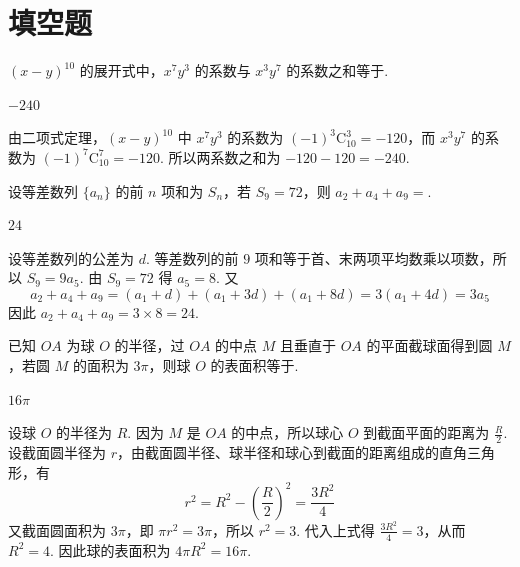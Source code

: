 \section{填空题}

\begin{problem}
\((x - y)^{10}\) 的展开式中，\(x^{7}y^{3}\) 的系数与 \(x^{3}y^{7}\) 的系数之和等于\fillinblank{}.
\end{problem}

\begin{answer}
\(-240\)
\end{answer}

\begin{solution}
由二项式定理，\((x-y)^{10}\) 中 \(x^7y^3\) 的系数为 \((-1)^3\mathrm C_{10}^{3}=-120\)，而 \(x^3y^7\) 的系数为 \((-1)^7\mathrm C_{10}^{7}=-120\). 所以两系数之和为 \(-120-120=-240\).
\end{solution}

\begin{problem}
设等差数列 \(\{a_{n}\}\) 的前 \(n\) 项和为 \(S_{n}\)，若 \(S_{9} = 72\)，则 \(a_{2} + a_{4} + a_{9} = \)\fillinblank{}.
\end{problem}

\begin{answer}
\(24\)
\end{answer}

\begin{solution}
设等差数列的公差为 \(d\). 等差数列的前 \(9\) 项和等于首、末两项平均数乘以项数，所以 \(S_9=9a_5\). 由 \(S_9=72\) 得 \(a_5=8\). 又
\[
a_2+a_4+a_9=(a_1+d)+(a_1+3d)+(a_1+8d)=3(a_1+4d)=3a_5
\]
因此 \(a_2+a_4+a_9=3\times8=24\).
\end{solution}

\begin{problem}
已知 \(OA\) 为球 \(O\) 的半径，过 \(OA\) 的中点 \(M\) 且垂直于 \(OA\) 的平面截球面得到圆 \(M\)，若圆 \(M\) 的面积为 \(3\pi\)，则球 \(O\) 的表面积等于\fillinblank{}.
\end{problem}

\begin{answer}
\(16\pi\)
\end{answer}

\begin{solution}
设球 \(O\) 的半径为 \(R\). 因为 \(M\) 是 \(OA\) 的中点，所以球心 \(O\) 到截面平面的距离为 \(\frac{R}{2}\). 设截面圆半径为 \(r\)，由截面圆半径、球半径和球心到截面的距离组成的直角三角形，有
\[
r^2=R^2-\left(\frac{R}{2}\right)^2=\frac{3R^2}{4}
\]
又截面圆面积为 \(3\pi\)，即 \(\pi r^2=3\pi\)，所以 \(r^2=3\). 代入上式得 \(\frac{3R^2}{4}=3\)，从而 \(R^2=4\). 因此球的表面积为 \(4\pi R^2=16\pi\).
\end{solution}

